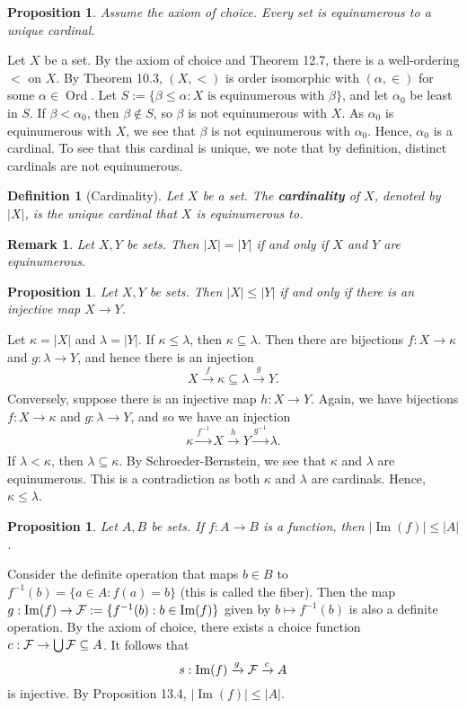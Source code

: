 \documentclass[10pt]{article}
\makeatletter
\DeclareMathOperator{\im}{Im}
\DeclareMathOperator{\Ord}{Ord}
\theoremstyle{newstyle}
\newtheorem{remark}[thm]{Remark}
\newtheorem{prop}[thm]{Proposition}
\newtheorem{defn}[thm]{Definition}
\newenvironment{pf}[1][\proofname]{\par
  \pushQED{\qed}%
  \normalfont \topsep0\p@\relax
  \trivlist
  \item[\hskip\labelsep\scshape
  #1\@addpunct{.}]\ignorespaces
}{%
  \popQED\endtrivlist\@endpefalse
}
\makeatother
\begin{document}
\begin{prop}
Assume the axiom of choice. Every set is equinumerous to a unique cardinal.
\end{prop}
\begin{pf}
Let $X$ be a set. By the axiom of choice and Theorem 12.7, there is a well-ordering 
$<$ on $X$. By Theorem 10.3, $(X, <)$ is order isomorphic with $(\alpha, \in)$ for some 
$\alpha \in \Ord$. Let $S := \{\beta \leq \alpha : X \text{ is equinumerous with } \beta\}$, 
and let $\alpha_0$ be least in $S$. If $\beta < \alpha_0$, then $\beta \notin S$, 
so $\beta$ is not equinumerous with $X$. As $\alpha_0$ is equinumerous with $X$, 
we see that $\beta$ is not equinumerous with $\alpha_0$. Hence, $\alpha_0$ is a cardinal.
To see that this cardinal is unique, we note that by definition, distinct cardinals 
are not equinumerous.
\end{pf}

\begin{defn}[Cardinality] 
Let $X$ be a set. The {\bf cardinality} of $X$, denoted by $|X|$, is the unique 
cardinal that $X$ is equinumerous to.
\end{defn}

\begin{remark} 
Let $X, Y$ be sets. Then $|X| = |Y|$ if and only if $X$ and $Y$ are equinumerous.
\end{remark} 

\begin{prop}
Let $X, Y$ be sets. Then $|X| \leq |Y|$ if and only if there is an injective map 
$X \to Y$.
\end{prop}
\begin{pf}
Let $\kappa = |X|$ and $\lambda = |Y|$. If $\kappa \leq \lambda$, then $\kappa \subseteq \lambda$. 
Then there are bijections $f : X \to \kappa$ and $g : \lambda \to Y$, and hence there is 
an injection 
\[ X \xrightarrow[]{f} \kappa \subseteq \lambda \xrightarrow[]{g} Y. \]
Conversely, suppose there is an injective map $h : X \to Y$. Again, we have 
bijections $f : X \to \kappa$ and $g : \lambda \to Y$, and so we have an injection 
\[ \kappa \xrightarrow[]{f^{-1}} X \xrightarrow[]{h} Y \xrightarrow[]{g^{-1}} \lambda. \]
If $\lambda < \kappa$, then $\lambda \subseteq \kappa$. By Schroeder-Bernstein, 
we see that $\kappa$ and $\lambda$ are equinumerous. This is a contradiction as 
both $\kappa$ and $\lambda$ are cardinals. Hence, $\kappa \leq \lambda$. 
\end{pf}

\begin{prop}
Let $A, B$ be sets. If $f : A \to B$ is a function, then $|\im(f)| \leq |A|$. 
\end{prop}
\begin{pf}
Consider the definite operation that maps $b \in B$ to $f^{-1}(b) = \{a \in A : f(a) = b\}$ 
(this is called the fiber). Then the map $g : \im(f) \to {\cal F} := \{f^{-1}(b) : b \in \im(f)\}$ 
given by $b \mapsto f^{-1}(b)$ is also a definite operation. By the axiom of choice, there 
exists a choice function $c : {\cal F} \to \bigcup {\cal F} \subseteq A$. 
It follows that 
\[ s : \im(f) \xrightarrow[]{g} {\cal F} \xrightarrow[]{c} A \] 
is injective.  By Proposition 13.4, $|\im(f)| \leq |A|$. 
\end{pf}
\end{document}
